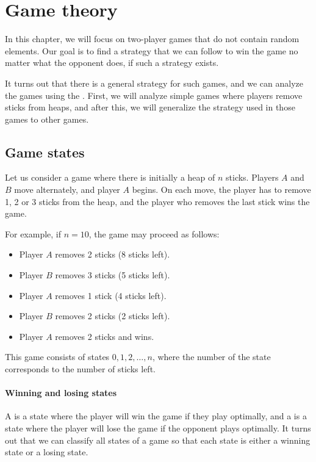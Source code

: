 \chapter{Game theory}

In this chapter, we will focus on two-player
games that do not contain random elements.
Our goal is to find a strategy that we can
follow to win the game
no matter what the opponent does,
if such a strategy exists.

It turns out that there is a general strategy
for such games,
and we can analyze the games using the .
First, we will analyze simple games where
players remove sticks from heaps,
and after this, we will generalize the strategy
used in those games to other games.

\section{Game states}

Let us consider a game where there is initially
a heap of $n$ sticks.
Players $A$ and $B$ move alternately,
and player $A$ begins.
On each move, the player has to remove
1, 2 or 3 sticks from the heap,
and the player who removes the last stick wins the game.

For example, if $n=10$, the game may proceed as follows:
\begin{itemize}[noitemsep]
    \item Player $A$ removes 2 sticks (8 sticks left).
    \item Player $B$ removes 3 sticks (5 sticks left).
    \item Player $A$ removes 1 stick (4 sticks left).
    \item Player $B$ removes 2 sticks (2 sticks left).
    \item Player $A$ removes 2 sticks and wins.
\end{itemize}

This game consists of states $0,1,2,\ldots,n$,
where the number of the state corresponds to
the number of sticks left.

\subsubsection{Winning and losing states}


A  is a state where
the player will win the game if they
play optimally,
and a  is a state
where the player will lose the game if the
opponent plays optimally.
It turns out that we can classify all states
of a game so that each state is either
a winning state or a losing state.

